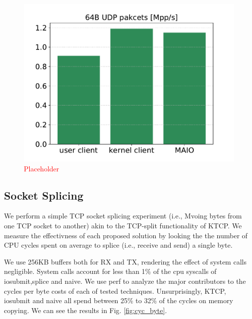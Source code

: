 \begin{figure}[t]
    \centering
    \includegraphics[width=\columnwidth]{bifurcated.pdf}
    \caption{\textcolor{red}{Placeholder}}
    \label{fig:tx_compare}
\end{figure}
\subsection{Socket Splicing}
We perform a simple TCP socket splicing experiment (i.e., Mvoing bytes from one TCP socket to another) akin to the TCP-split functionality of KTCP. We measure the effectivness of each proposed solution by looking the the number of CPU cycles spent on average to splice (i.e., receive and send) a single byte.

We use 256KB buffers both for RX and TX, rendering the effect of system calls negligible. System calls account for less than 1\% of the cpu syscalls of iosubmit,splice and naive. We use perf\cite{perf} to analyze the major contributors to the cycles per byte costs of each of tested techniques. Unsurprisingly, KTCP, iosubmit and naive all spend between 25\% to 32\% of the cycles on memory copying. We can see the results in Fig. \ref{fig:cyc_byte}.





